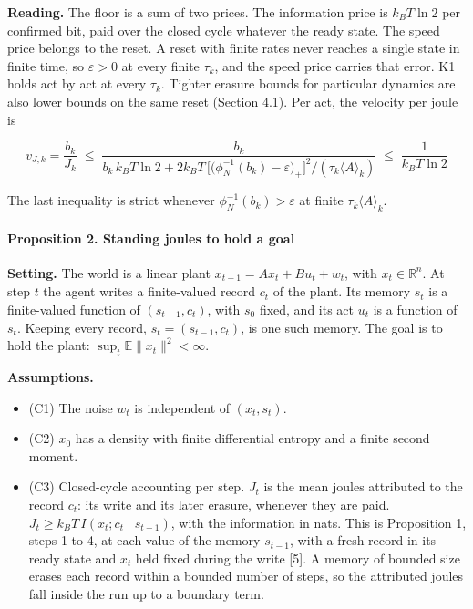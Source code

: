 \documentclass[
  10pt,
]{article}
\providecommand{\tightlist}{%
  \setlength{\itemsep}{0pt}\setlength{\parskip}{0pt}}
\begin{document}
\textbf{Reading.} The floor is a sum of two prices. The information
price is \(k_B T\ln 2\) per confirmed bit, paid over the closed cycle
whatever the ready state. The speed price belongs to the reset. A reset
with finite rates never reaches a single state in finite time, so
\(\varepsilon > 0\) at every finite \(\tau_k\), and the speed price
carries that error. K1 holds act by act at every \(\tau_k\). Tighter
erasure bounds for particular dynamics are also lower bounds on the same
reset (Section 4.1). Per act, the velocity per joule is

\[v_{J,k} = \frac{b_k}{J_k} \;\le\; \frac{b_k}{b_k\, k_B T \ln 2 + 2 k_B T\,\big[\big(\phi_N^{-1}(b_k) - \varepsilon\big)_+\big]^2/(\tau_k\langle A\rangle_k)} \;\le\; \frac{1}{k_B T \ln 2}\]

The last inequality is strict whenever
\(\phi_N^{-1}(b_k) > \varepsilon\) at finite
\(\tau_k\langle A\rangle_k\).

\paragraph{Proposition 2. Standing joules to hold a
goal}\label{proposition-2.-standing-joules-to-hold-a-goal}

\textbf{Setting.} The world is a linear plant
\(x_{t+1} = A x_t + B u_t + w_t\), with \(x_t \in \mathbb{R}^n\). At
step \(t\) the agent writes a finite-valued record \(c_t\) of the plant.
Its memory \(s_t\) is a finite-valued function of \((s_{t-1}, c_t)\),
with \(s_0\) fixed, and its act \(u_t\) is a function of \(s_t\).
Keeping every record, \(s_t = (s_{t-1}, c_t)\), is one such memory. The
goal is to hold the plant: \(\sup_t \mathbb{E}\|x_t\|^2 < \infty\).

\textbf{Assumptions.}

\begin{itemize}
\tightlist
\item
  (C1) The noise \(w_t\) is independent of \((x_t, s_t)\).
\item
  (C2) \(x_0\) has a density with finite differential entropy and a
  finite second moment.
\item
  (C3) Closed-cycle accounting per step. \(J_t\) is the mean joules
  attributed to the record \(c_t\): its write and its later erasure,
  whenever they are paid. \(J_t \ge k_B T\, I(x_t; c_t \mid s_{t-1})\),
  with the information in nats. This is Proposition 1, steps 1 to 4, at
  each value of the memory \(s_{t-1}\), with a fresh record in its ready
  state and \(x_t\) held fixed during the write {[}5{]}. A memory of
  bounded size erases each record within a bounded number of steps, so
  the attributed joules fall inside the run up to a boundary term.
\end{itemize}
\end{document}
